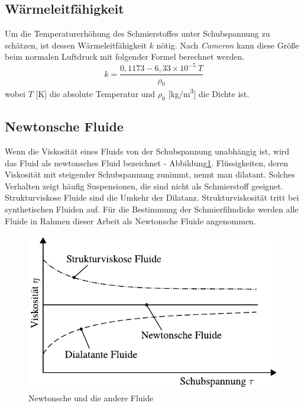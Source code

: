 \subsection*{Wärmeleitfähigkeit}
\label{waermeleitfaehigkeit}

Um die Temperaturerhöhung des Schmierstoffes unter Schubspannung zu schätzen, ist dessen Wärmeleitfähigkeit $k$ nötig.
Nach \textit{Cameron} \cite{cameron} kann diese Größe beim normalen Luftdruck mit folgender Formel berechnet werden.
\begin{equation}
    \label{eq:waermeleitfaehigkeit}
    k = \frac{0,1173 - 6,33 \times 10^{-5} \ T}{\rho_0}
\end{equation}
%
wobei $T$ [\si{\kelvin}] die absolute Temperatur und $\rho_0$ [\si{kg/m^3}] die Dichte ist.

\subsection*{Newtonsche Fluide}
\label{sub:newtonsche_fluide}

Wenn die Viskosität eines Fluids von der Schubspannung unabhängig ist, wird das Fluid als newtonsches Fluid bezeichnet - Abbildung\ref{fig:newtonsche_fluide}.
Flüssigkeiten, deren Viskosität mit steigender Schubspannung zunimmt, nennt man dilatant.
Solches Verhalten zeigt häufig Suspensionen, die sind nicht als Schmierstoff geeignet.
Strukturviskose Fluide sind die Umkehr der Dilatanz.
Strukturviskosität tritt bei synthetischen Fluiden auf.
Für die Bestimmung der Schmierfilmdicke werden alle Fluide in Rahmen dieser Arbeit als Newtonsche Fluide angenommen.
\begin{figure}[htb]
    \centering
    \includegraphics[]{./images/newtonsche_nichtnewtonsche_fluide.pdf}
    \caption{Newtonsche und die andere Fluide\cite{wisniewski}}
    \label{fig:newtonsche_fluide}
\end{figure}
%

